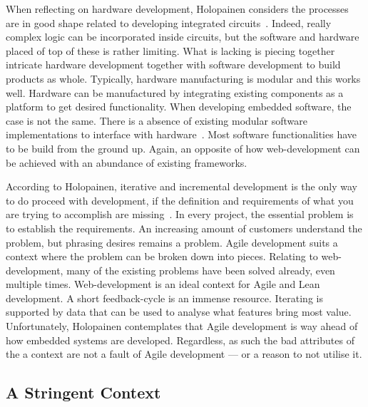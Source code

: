 \documentclass[english]{tktltiki2}
\begin{document}
When reflecting on hardware development, Holopainen considers the processes are in good shape related to developing integrated circuits~\cite{Hol15a}. Indeed, really complex logic can be incorporated inside circuits, but the software and hardware placed of top of these is rather limiting. What is lacking is piecing together intricate hardware development together with software development to build products as whole. Typically, hardware manufacturing is modular and this works well. Hardware can be manufactured by integrating existing components as a platform to get desired functionality. When developing embedded software, the case is not the same. There is a absence of existing modular software implementations to interface with hardware~\cite{Hol15a}. Most software functionalities have to be build from the ground up. Again, an opposite of how web-development can be achieved with an abundance of existing frameworks.

According to Holopainen, iterative and incremental development is the only way to do proceed with development, if the definition and requirements of what you are trying to accomplish are missing~\cite{Hol15a}. In every project, the essential problem is to establish the requirements. An increasing amount of customers understand the problem, but phrasing desires remains a problem. Agile development suits a context where the problem can be broken down into pieces. Relating to web-development, many of the existing problems have been solved already, even multiple times. Web-development is an ideal context for Agile and Lean development. A short feedback-cycle is an immense resource. Iterating is supported by data that can be used to analyse what features bring most value. Unfortunately, Holopainen contemplates that Agile development is way ahead of how embedded systems are developed. Regardless, as such the bad attributes of the a context are not a fault of Agile development — or a reason to not utilise it.

\subsection{A Stringent Context}
\end{document}
